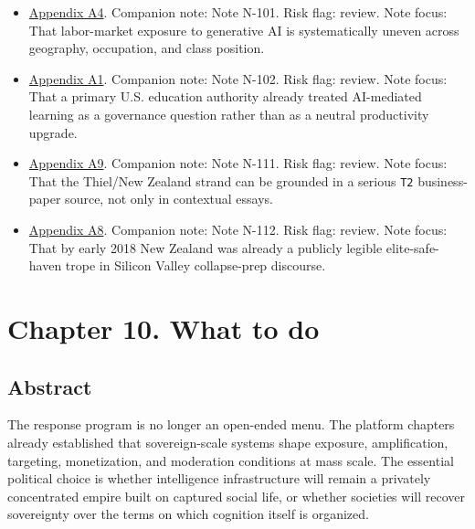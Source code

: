 \documentclass[
  american,
  11pt,
  letterpaper,
]{article}
\begin{document}
\begin{itemize}
{  A2}. Companion note: Note N-100. Risk flag: review. Note focus: That
  generative AI exposure reaches well beyond narrow routine clerical
  work and extends into professional and white-collar task bundles.
\item
  \hyperref[ch-09-appendix-a4-gen-ai-artificial-intelligence-and-the-future-of-work]{Appendix
  A4}. Companion note: Note N-101. Risk flag: review. Note focus: That
  labor-market exposure to generative AI is systematically uneven across
  geography, occupation, and class position.
\item
  \hyperref[ch-09-appendix-a1-artificial-intelligence-and-the-future-of-teaching-and-learning-insights-and-recommendations]{Appendix
  A1}. Companion note: Note N-102. Risk flag: review. Note focus: That a
  primary U.S. education authority already treated AI-mediated learning
  as a governance question rather than as a neutral productivity
  upgrade.
\item
  \hyperref[ch-09-appendix-a9-new-zealand-woos-the-wealthy-with-golden-visa-changes]{Appendix
  A9}. Companion note: Note N-111. Risk flag: review. Note focus: That
  the Thiel/New Zealand strand can be grounded in a serious \texttt{T2}
  business-paper source, not only in contextual essays.
\item
  \hyperref[ch-09-appendix-a8-why-silicon-valley-billionaires-are-prepping-for-the-apocalypse-in-new-zealand]{Appendix
  A8}. Companion note: Note N-112. Risk flag: review. Note focus: That
  by early 2018 New Zealand was already a publicly legible
  elite-safe-haven trope in Silicon Valley collapse-prep discourse.
\end{itemize}

\newpage

\section{Chapter 10. What to do}\label{chapter-10.-what-to-do}

\subsection{Abstract}\label{abstract-10}

The response program is no longer an open-ended menu. The platform
chapters already established that sovereign-scale systems shape
exposure, amplification, targeting, monetization, and moderation
conditions at mass scale. The essential political choice is whether
intelligence infrastructure will remain a privately concentrated empire
built on captured social life, or whether societies will recover
sovereignty over the terms on which cognition itself is organized.
\end{document}
